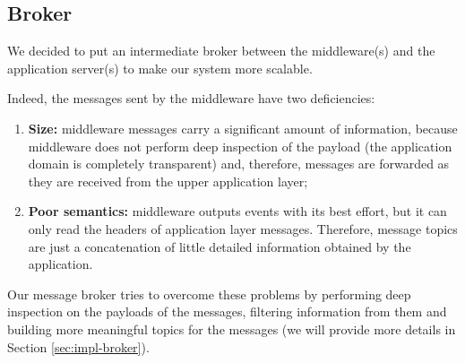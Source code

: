\subsection{Broker}

We decided to put an intermediate broker between the middleware(s) and the
application server(s) to make our system more scalable.

Indeed, the messages sent by the middleware have two deficiencies:

\begin{enumerate}
  \item \textbf{Size:} middleware messages carry a significant amount of
    information, because middleware does not perform deep inspection of the
    payload (the application domain is completely transparent) and, therefore,
    messages are forwarded as they are received from the upper application
    layer;
  \item \textbf{Poor semantics:} middleware outputs events with its best
    effort, but it can only read the headers of application layer messages.
    Therefore, message topics are just a concatenation of little detailed
    information obtained by the application.
\end{enumerate}

Our message broker tries to overcome these problems by performing deep
inspection on the payloads of the messages, filtering information from them and
building more meaningful topics for the messages (we will provide more details
in Section \ref{sec:impl-broker}).


